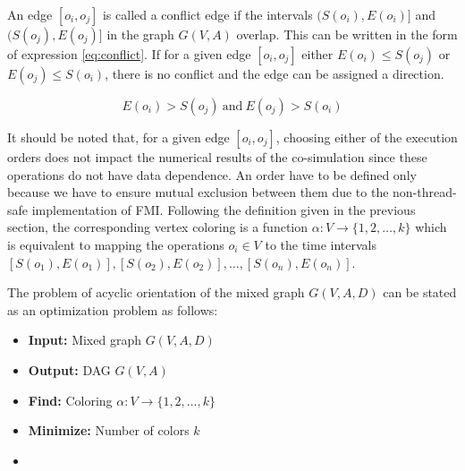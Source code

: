 An edge $[o_i,o_j]$ is called a conflict edge if the intervals $(S(o_i), E(o_i)]$ and $(S(o_j), E(o_j)]$ in the graph $G(V,A)$ overlap. This can be written in the form of expression \ref{eq:conflict}. If for a given edge $[o_i,o_j]$ either $E(o_i) \leq S(o_j)$ or $E(o_j) \leq S(o_i)$, there is no conflict and the edge can be assigned a direction. 

\begin{equation}
E(o_i) > S(o_j)\ \text{and}\ E(o_j) > S(o_i)
\label{eq:conflict}
\end{equation}

It should be noted that, for a given edge $[o_i, o_j]$, choosing either of the execution orders does not impact the numerical results of the co-simulation since these operations do not have data dependence. An order have to be defined only because we have to ensure mutual exclusion between them due to the non-thread-safe implementation of FMI. Following the definition given in the previous section, the corresponding vertex coloring is a function $\alpha: V \rightarrow \{1, 2, \ldots, k\}$ which is equivalent to mapping the operations $o_i \in V$ to the time intervals $[S(o_1), E(o_1)], [S(o_2), E(o_2)], \ldots, [S(o_n), E(o_n)]$.

The problem of acyclic orientation of the mixed graph $G(V,A,D)$ can be stated as an optimization problem as follows:

\begin{itemize}[label={},topsep=1pt,parsep=1pt,partopsep=1pt,leftmargin=*]	
\item \textbf{Input:} Mixed graph $G(V,A,D)$
\item \textbf{Output:} DAG $G(V,A)$
\item \textbf{Find:} Coloring $\alpha: V \rightarrow \{1, 2, \ldots, k\}$
\item \textbf{Minimize:} Number of colors $k$
\item {}
\end{itemize}

